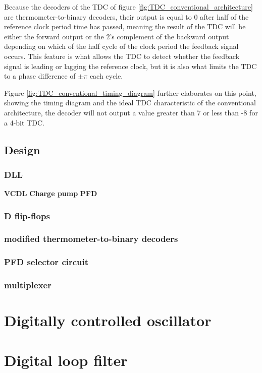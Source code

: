 Because the decoders of the TDC of figure \ref{fig:TDC_conventional_architecture} are thermometer-to-binary decoders, their output is equal to 0 after half of the reference clock period time has
passed, meaning the result of the TDC will be either the forward output or the 2's complement of the backward output depending on which of the half cycle of the clock period the feedback signal
occurs. This feature is what allows the TDC to detect whether the feedback signal is leading or lagging the reference clock, but it is also what limits the TDC to a phase difference of $\pm \pi$
each cycle.

Figure \ref{fig:TDC_conventional_timing_diagram} further elaborates on this point, showing the timing diagram and the ideal TDC characteristic of the conventional architecture, the decoder 
will not output a value greater than 7 or less than -8 for a 4-bit TDC.




\subsection{Design}

\subsubsection{DLL}

\textbf{VCDL}
\textbf{Charge pump}
\textbf{PFD}

\subsubsection{D flip-flops}

\subsubsection{modified thermometer-to-binary decoders}

\subsubsection{PFD selector circuit}

\subsubsection{multiplexer}

\section{Digitally controlled oscillator}

\section{Digital loop filter}
